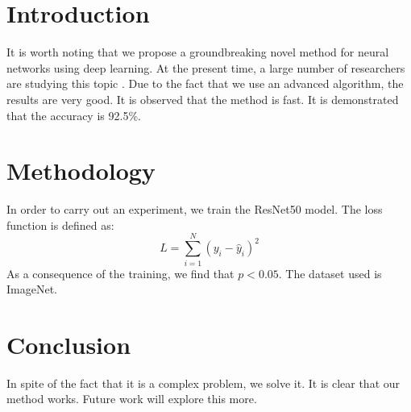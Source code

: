 \documentclass{article}
\begin{document}
\section{Introduction}
It is worth noting that we propose a groundbreaking novel method for neural networks using deep learning. 
At the present time, a large number of researchers are studying this topic \cite{smith2023}. 
Due to the fact that we use an advanced algorithm, the results are very good. 
It is observed that the method is fast. 
It is demonstrated that the accuracy is 92.5\%.

\section{Methodology}
In order to carry out an experiment, we train the ResNet50 model. 
The loss function is defined as:
\begin{equation}
L = \sum_{i=1}^{N} (y_i - \hat{y}_i)^2
\end{equation}
As a consequence of the training, we find that $p < 0.05$. 
The dataset used is ImageNet.

\section{Conclusion}
In spite of the fact that it is a complex problem, we solve it. 
It is clear that our method works. 
Future work will explore this more.
\end{document}

